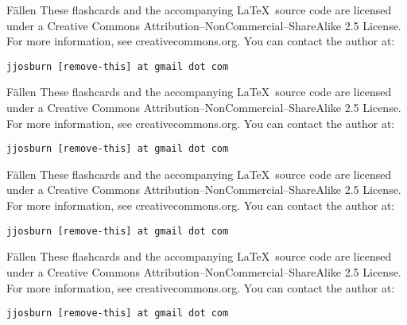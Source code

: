 \documentclass[avery5371,frame,grid]{flashcards}
\begin{document}
\begin{flashcard}[Verb]{\Huge Fällen}
{\large These flashcards and the accompanying \LaTeX \, source code are licensed
under a Creative Commons Attribution--NonCommercial--ShareAlike 2.5 License.  
For more information, see creativecommons.org.  You can contact the author at: }
\begin{center}
\begin{small}\tt jjosburn [remove-this] at gmail dot com\end{small}
\end{center}
\end{flashcard}

\begin{flashcard}[Verb]{\Huge Fällen}
{\large These flashcards and the accompanying \LaTeX \, source code are licensed
under a Creative Commons Attribution--NonCommercial--ShareAlike 2.5 License.  
For more information, see creativecommons.org.  You can contact the author at: }
\begin{center}
\begin{small}\tt jjosburn [remove-this] at gmail dot com\end{small}
\end{center}
\end{flashcard}

\begin{flashcard}[Verb]{\Huge Fällen}
{\large These flashcards and the accompanying \LaTeX \, source code are licensed
under a Creative Commons Attribution--NonCommercial--ShareAlike 2.5 License.  
For more information, see creativecommons.org.  You can contact the author at: }
\begin{center}
\begin{small}\tt jjosburn [remove-this] at gmail dot com\end{small}
\end{center}
\end{flashcard}

\begin{flashcard}[Verb]{\Huge Fällen}
{\large These flashcards and the accompanying \LaTeX \, source code are licensed
under a Creative Commons Attribution--NonCommercial--ShareAlike 2.5 License.  
For more information, see creativecommons.org.  You can contact the author at: }
\begin{center}
\begin{small}\tt jjosburn [remove-this] at gmail dot com\end{small}
\end{center}
\end{flashcard}
\end{document}
